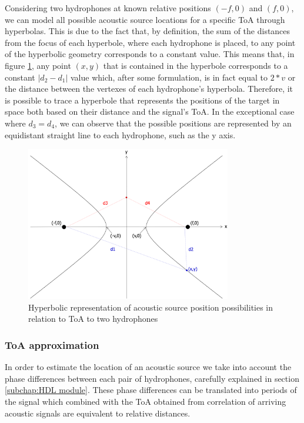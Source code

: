 Considering two hydrophones at known relative positions $(-f,0)$ and $(f,0)$, we can model all possible acoustic source locations for a specific ToA through hyperbolas. This is due to the fact that, by definition, the sum of the distances from the focus of each hyperbole, where each hydrophone is placed, to any point of the hyperbolic geometry corresponds to a constant value. 
This means that, in figure \ref{fig:hyper}, any point $(x,y)$ that is contained in the hyperbole corresponds to a constant $|d_2-d_1|$ value which, after some formulation, is in fact equal to $2*v$ or the distance between the vertexes of each hydrophone's hyperbola. Therefore, it is possible to trace a hyperbole that represents the positions of the target in space both based on their distance and the signal's ToA. In the exceptional case where $d_3=d_4$, we can observe that the possible positions are represented by an equidistant straight line to each hydrophone, such as the y axis.

\begin{figure}[!htbp]
	\centering
	\includegraphics[width=0.8\textwidth]{figures/hyperbole-dist}
	\captionsetup{justification=centering,margin=2cm}
	\caption{Hyperbolic representation of acoustic source position possibilities in relation to ToA to two hydrophones}
	\label{fig:hyper}
\end{figure}

\subsubsection{ToA approximation}

In order to estimate the location of an acoustic source we take into account the phase differences between each pair of hydrophones, carefully explained in section \ref{subchap:HDL module}. These phase differences can be translated into periods of the signal which combined with the ToA obtained from correlation of arriving acoustic signals are equivalent to relative distances.

